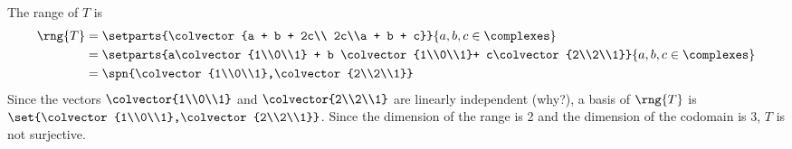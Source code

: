 The range of $T$ is 
\begin{align*}
\rng{T} 
&= \setparts{\colvector{a + b + 2c\\ 2c\\a + b + c}}{a,b,c\in\complexes}\\
&= \setparts{a\colvector{1\\0\\1} + b \colvector{1\\0\\1}+ c\colvector{2\\2\\1}}{a,b,c\in\complexes}\\
&= \spn{\colvector{1\\0\\1},\colvector{2\\2\\1}}
\end{align*}
Since the vectors $\colvector{1\\0\\1}$ and $\colvector{2\\2\\1}$ are linearly independent (why?), a basis of $\rng{T}$ is $\set{\colvector{1\\0\\1},\colvector{2\\2\\1}}$.  Since the dimension of the range is 2 and the dimension of the codomain is 3, $T$ is not surjective. 